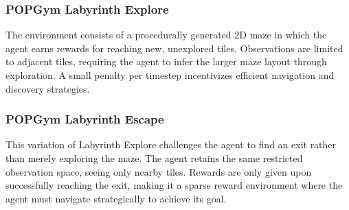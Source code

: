 \subsubsection{POPGym Labyrinth Explore}
The environment consists of a procedurally generated 2D maze in which the agent earns rewards for reaching new, unexplored tiles. Observations are limited to adjacent tiles, requiring the agent to infer the larger maze layout through exploration. A small penalty per timestep incentivizes efficient navigation and discovery strategies.

\subsubsection{POPGym Labyrinth Escape}
This variation of Labyrinth Explore challenges the agent to find an exit rather than merely exploring the maze. The agent retains the same restricted observation space,  seeing only nearby tiles. Rewards are only given upon successfully reaching the exit, making it a sparse reward environment where the agent must navigate strategically to achieve its goal.